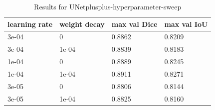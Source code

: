 \begin{table}
\caption{Results for UNetplusplus-hyperparameter-sweep}
\label{tab-UNetplusplus-hyperparameter-sweep_table}
\begin{tabular}{llll}
\toprule
learning rate & weight decay & max val Dice & max val IoU \\
\midrule
3e-04 & 0 & 0.8862 & 0.8209 \\
3e-04 & 1e-04 & 0.8839 & 0.8183 \\
1e-04 & 0 & 0.8889 & 0.8245 \\
1e-04 & 1e-04 & 0.8911 & 0.8271 \\
3e-05 & 0 & 0.8806 & 0.8144 \\
3e-05 & 1e-04 & 0.8825 & 0.8160 \\
\bottomrule
\end{tabular}
\end{table}
